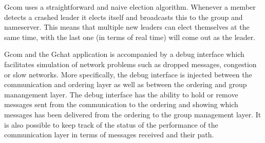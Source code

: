 		Gcom uses a straightforward and naive election algorithm.
		Whenever a member detects a crashed leader it elects itself and broadcasts this to the group and nameserver.
		This means that multiple new leaders can elect themselves at the same time, with the last one (in terms of real time) will come out as the leader.


	Gcom and the Gchat application is accompanied by a debug interface which facilitates simulation of network problems such as dropped messages, congestion or slow networks.
	More specifically, the debug interface is injected between the communication and ordering layer as well as between the ordering and group manangement layer.
	The debug interface has the ability to hold or remove messages sent from the communication to the ordering and showing which messages has been delivered from the ordering to the group management layer.
	It is also possible to keep track of the status of the performance of the communication layer in terms of messages received and their path.
